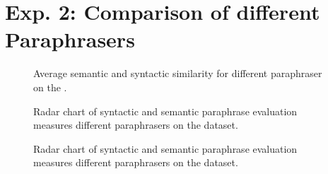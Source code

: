 \section{Exp. 2: Comparison of different Paraphrasers}
\label{sec:app_paraphrases}

\begin{figure}[H]
    \centering
    
    \caption{Average semantic and syntactic similarity for different paraphraser on the \dataGutenberg{}.}
    \label{fig:sem_syn_gutenberg}
\end{figure}

\begin{figure}[H]
    \centering
    
    \caption{Radar chart of syntactic and semantic paraphrase evaluation measures different paraphrasers on the \dataGutenberg{} dataset.}
    \label{fig:radar_gutenberg}
\end{figure}

\begin{figure}[H]
    \centering
    
    \caption{Radar chart of syntactic and semantic paraphrase evaluation measures different paraphrasers on the \dataBlog{} dataset.}
    \label{fig:radar_blog}
\end{figure}
